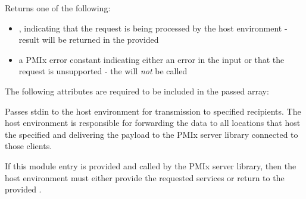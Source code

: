 Returns one of the following:

\begin{itemize}
    \item {}, indicating that the request is being processed by the host environment - result will be returned in the provided 
    \item a PMIx error constant indicating either an error in the input or that the request is unsupported - the  will \textit{not} be called
\end{itemize}

\reqattrstart
The following attributes are required to be included in the passed  array:


\reqattrend

\descr

Passes stdin to the host environment for transmission to specified recipients. The host environment is responsible for forwarding the data to all locations that host the specified  and delivering the payload to the \ac{PMIx} server library connected to those clients.

\advicermstart
If this module entry is provided and called by the \ac{PMIx} server library, then the host environment must either provide the requested services or return  to the provided .
\advicermend

